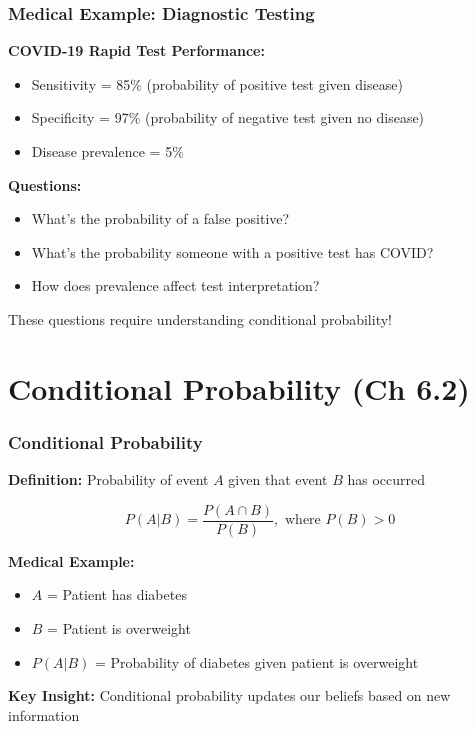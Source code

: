 \documentclass{beamer}
\begin{document}
\begin{frame}
\frametitle{Medical Example: Diagnostic Testing}
\textbf{COVID-19 Rapid Test Performance:}
\begin{itemize}
\item Sensitivity = 85\% (probability of positive test given disease)
\item Specificity = 97\% (probability of negative test given no disease)
\item Disease prevalence = 5\%
\end{itemize}

\vspace{0.5cm}
\textbf{Questions:}
\begin{itemize}
\item What's the probability of a false positive?
\item What's the probability someone with a positive test has COVID?
\item How does prevalence affect test interpretation?
\end{itemize}

\vspace{0.5cm}
These questions require understanding conditional probability!
\end{frame}

\section{Conditional Probability (Ch 6.2)}

\begin{frame}
\frametitle{Conditional Probability}
\textbf{Definition:} Probability of event $A$ given that event $B$ has occurred

$$P(A|B) = \frac{P(A \cap B)}{P(B)}, \text{ where } P(B) > 0$$

\vspace{0.5cm}
\textbf{Medical Example:}
\begin{itemize}
\item $A$ = Patient has diabetes
\item $B$ = Patient is overweight
\item $P(A|B)$ = Probability of diabetes given patient is overweight
\end{itemize}

\vspace{0.5cm}
\textbf{Key Insight:} Conditional probability updates our beliefs based on new information
\end{frame}
\end{document}
